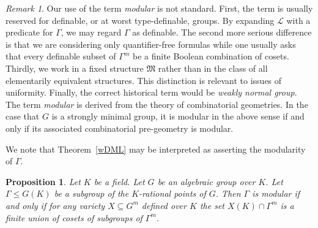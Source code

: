 \documentclass{amsart}
\newcommand{\cL}{{\mathcal L}}
\newcommand{\fM}{{\mathfrak M}}
\newtheorem{prop}[thm]{Proposition}
\theoremstyle{definition}
\theoremstyle{remark}
\newtheorem{Rk}[thm]{Remark}
\begin{document}
\begin{Rk}
Our use of the term \emph{modular} is not standard.  First, the term is usually reserved
for definable, or at worst type-definable, groups.  By expanding $\cL$ with a predicate for 
$\Gamma$,  we may regard $\Gamma$ as definable.  The second more serious difference is that
we are considering only quantifier-free formulas while one usually asks that every definable 
subset of $\Gamma^m$ be a finite Boolean combination of cosets.  Thirdly, we work in a fixed
structure $\fM$ rather than in the class of all elementarily equivalent structures.  This distinction 
is relevant to issues of uniformity.  Finally, the correct historical term would be \emph{weakly normal group}.  
The term \emph{modular} is derived from the theory of combinatorial geometries.  In the case that 
$G$ is a strongly minimal group, it is modular in the above sense if and only if its associated
combinatorial pre-geometry is modular.
\end{Rk}

We note that Theorem~\ref{wDML} may be interpreted as asserting the modularity of $\Gamma$.

\begin{prop}
\label{modprop}
Let $K$ be a field.  Let $G$ be an algebraic group over $K$.
Let $\Gamma \leq G(K)$ be a subgroup of the $K$-rational points of $G$.
Then $\Gamma$ is modular if and only if for any variety $X \subseteq G^m$
defined over $K$ the set $X(K) \cap \Gamma^m$ is a finite union of cosets of subgroups of 
$\Gamma^m$.
\end{prop}
\end{document}
